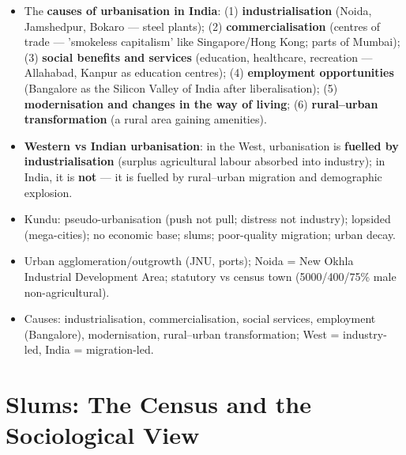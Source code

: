 \begin{KeyConcept}
\begin{itemize}
\item The \textbf{causes of urbanisation in India}: (1) \textbf{industrialisation} (Noida, Jamshedpur, Bokaro --- steel plants); (2) \textbf{commercialisation} (centres of trade --- 'smokeless capitalism' like Singapore/Hong Kong; parts of Mumbai); (3) \textbf{social benefits and services} (education, healthcare, recreation --- Allahabad, Kanpur as education centres); (4) \textbf{employment opportunities} (Bangalore as the Silicon Valley of India after liberalisation); (5) \textbf{modernisation and changes in the way of living}; (6) \textbf{rural--urban transformation} (a rural area gaining amenities).
\item \textbf{Western vs Indian urbanisation}: in the West, urbanisation is \textbf{fuelled by industrialisation} (surplus agricultural labour absorbed into industry); in India, it is \textbf{not} --- it is fuelled by rural--urban migration and demographic explosion.
\end{itemize}
\end{KeyConcept}

\begin{QuickRevision}
\begin{itemize}
\item Kundu: pseudo-urbanisation (push not pull; distress not industry); lopsided (mega-cities); no economic base; slums; poor-quality migration; urban decay.
\item Urban agglomeration/outgrowth (JNU, ports); Noida = New Okhla Industrial Development Area; statutory vs census town (5000/400/75\% male non-agricultural).
\item Causes: industrialisation, commercialisation, social services, employment (Bangalore), modernisation, rural--urban transformation; West = industry-led, India = migration-led.
\end{itemize}
\end{QuickRevision}

\section{Slums: The Census and the Sociological View}

